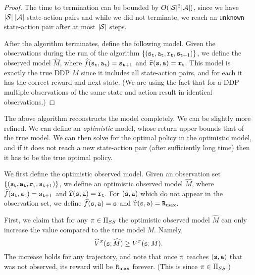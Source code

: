 \begin{proof}
The time to termination can be bounded by  $O(|\mathcal{S}|^2 |\mathcal{A}|)$, since we have  $|\mathcal{S}|\; |\mathcal{A}|$ state-action pairs and while we did not terminate, we reach an \texttt{unknown} state-action pair after at most  $|\mathcal{S}|$ steps.

After the algorithm terminates, define the following model. Given
the observations during the run of the algorithm
$\{({\tt s}_{\tt t},{\tt a}_{\tt t} ,{\tt r}_{\tt t},
{\tt s}_{{\tt t}+1})\}$, we define the observed model $\widehat{M}$,
where $\widehat{f}({\tt s}_{\tt t},{\tt a}_{\tt t})={\tt s}_{{\tt t}+1}$
and $\widehat{{\tt r}}({\tt s},{\tt a})={\tt r}_{\tt t}$. This model
is exactly the true DDP $M$ since it includes all state-action
pairs, and for each it has the correct reward and next state. (We
are using the fact that for a DDP multiple observations of the same
state and action result in identical observations.)
\end{proof}

The above algorithm reconstructs the model completely. We can be
slightly more refined. We can define an {\em optimistic} model, whose
return upper bounds that of the true model. We can then solve for
the optimal policy in the optimistic model, and if it does not reach a new state-action pair (after sufficiently long time) then it
has to be the true optimal policy.

We first define the optimistic observed model. Given an observation
set $\{({\tt s}_{\tt t},{\tt a}_{\tt t} ,{\tt r}_{\tt t},
{\tt s}_{{\tt t}+1})\}$, we define an optimistic observed model
$\widehat{M}$, where
$\widehat{f}({\tt s}_{\tt t},{\tt a}_{\tt t})={\tt s}_{{\tt t}+1}$ and
$\widehat{{\tt r}}({\tt s},{\tt a})={\tt r}_{\tt t}$.
%
For $({\tt s},{\tt a})$ which do not appear in the observation set,
we define $\widehat{f}({\tt s},{\tt a})={\tt s}$ and
$\widehat{{\tt r}}({\tt s},{\tt a})={\tt R}_{\max }$.

First, we claim that for any $\pi\in {\Pi _{SS}}$ the optimistic
observed model $\widehat{M}$ can only increase the value compared to
the true model $M$. Namely,
\[
\widehat{V}^\pi({\tt s};\widehat{M})\geq V^\pi({\tt s};M).
\]
The increase holds for any trajectory, and note that once $\pi$
reaches $({\tt s},{\tt a})$ that was not observed, its reward will be
${\tt R}_{\max }$ forever. (This is since $\pi\in {\Pi _{SS}}$.)

